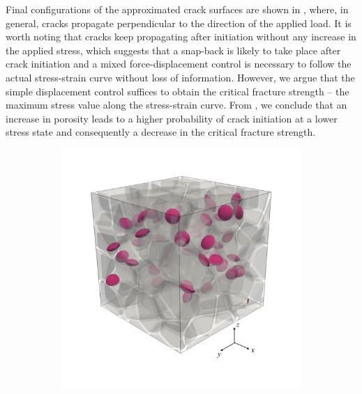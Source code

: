 Final configurations of the approximated crack surfaces are shown in , where, in general, cracks propagate perpendicular to the direction of the applied load.
It is worth noting that cracks keep propagating after initiation without any increase in the applied stress, which suggests that a snap-back is likely to take place after crack initiation and a mixed force-displacement control is necessary to follow the actual stress-strain curve without loss of information. However, we argue that the simple displacement control suffices to obtain the critical fracture strength -- the maximum stress value along the stress-strain curve. From , we conclude that an increase in porosity leads to a higher probability of crack initiation at a lower stress state and consequently a decrease in the critical fracture strength.
\begin{figure}[!htbp]
  \centering
  \begin{subfigure}{0.32\textwidth}
    \centering
    \includegraphics[width=\textwidth]{Chapter3/figures/b50_ini_new}
    \caption{}
    \label{b50_ini}
  \end{subfigure}
  \begin{subfigure}{0.32\textwidth}
    \centering

\end{subfigure}
\end{figure}
